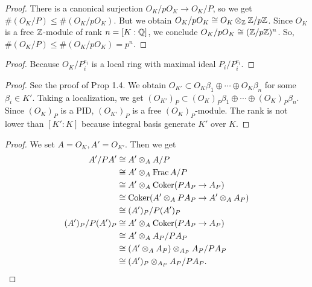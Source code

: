 \begin{proof}
There is a canonical surjection $O_K/pO_K \to O_K /P$, so we get $\# (O_K /P) \leq \# (O_K/pO_K)$. But we obtain $O_K/pO_K \cong O_K \otimes_{{\mathbb Z}} {\mathbb Z} / p {\mathbb Z}$. Since $O_K$ is a free ${\mathbb Z}$-module of rank $n = [K:{\mathbb Q}]$, we conclude $O_K/pO_K \cong ({\mathbb Z} / p {\mathbb Z} )^n $. So, $\# (O_K /P) \leq \# (O_K/pO_K) = p^n$.
\end{proof}



\barquo{
\[
\bigoplus_{i=1}^r O_K/P_i^{e_i} = \bigoplus_{i=1}^r (O_K/P_i^{e_i})_{P_i}
\]
}
\begin{proof}
  Because $O_K/P_i^{e_i}$ is a local ring with maximal ideal $P_i/P_i^{e_i}$.
\end{proof}


\begin{proof}
See the proof of Prop 1.4. We obtain $O_{K'} \subset O_K \beta_1 \oplus \cdots \oplus  O_K \beta_n$ for some $\beta_i \in K'$. Taking a localization, we get $(O_{K'})_P \subset (O_K)_P \beta_1 \oplus \cdots \oplus  (O_K)_P \beta_n$. Since $(O_K)_P$ is a PID, $(O_{K'})_P$ is a free $(O_K)_P$-module. The rank is not lower than $[K':K]$ because integral basis generate $K'$ over $K$.
\end{proof}


\begin{proof}
  We set $A = O_K, A'=O_{K'}$. Then we get
  \begin{align*}
    A'/PA' &\cong A' \otimes_A A/P \\
    &\cong A' \otimes_A \operatorname{Frac} A/P \\
    &\cong A' \otimes_A \operatorname{Coker} (PA_P \to A_P) \\
    &\cong \operatorname{Coker} (A' \otimes_A PA_P \to A' \otimes_A A_P) \\
    &\cong (A')_P / P(A')_P \\
    (A')_P / P(A')_P  &\cong A' \otimes_A \operatorname{Coker} (PA_P \to A_P) \\
    &\cong A' \otimes_A A_P / PA_P \\
    &\cong (A' \otimes_A  A_P) \otimes_{A_P} A_P / PA_P \\
    &\cong (A')_P \otimes_{A_P} A_P / PA_P.
  \end{align*}
\end{proof}



